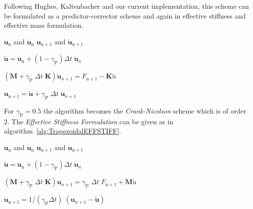 Following Hughes, Kaltenbacher and our current implementation, this scheme can be formulated as a predictor-corrector scheme 
and again in effective stiffness and
effective mass formulation.
\begin{algorithm}
\caption{General Trapezoidal Effective Mass Formulation} \label{alg:TrapezoidalEFFMASS}
\begin{algorithmic}
\REQUIRE $\mathbf{u}_{\mathrm{n}}$ and $\mathbf{\dot{u}}_{\mathrm{n}}$
\ENSURE $\mathbf{u}_{\mathrm{n}+1}$ and $\mathbf{\dot{u}}_{\mathrm{n}+1}$

\STATE {}
\STATE $\tilde{\mathbf{u}} = \mathbf{u}_{\mathrm{n}} + (1-\gamma_\mathrm{P}) \Delta t \; \mathbf{\dot{u}}_{n}$

\STATE {}
\STATE $\left( \mathbf{M} + \gamma_{\mathrm{P}}\; \Delta t\; \mathbf{K} \right) \mathbf{\dot{u}}_{n+1} =
F_{\mathrm{n}+1} - \mathbf{K} \tilde{\mathrm{u}}$ 

\STATE {}
\STATE $\mathbf{u}_{\mathrm{n}+1} = \tilde{\mathbf{u}} + \gamma_{\mathrm{P}}\; \Delta t \; \mathbf{\dot{u}}_{n+1}$
\end{algorithmic}
\end{algorithm}

For $\gamma_{\mathrm{P}} = 0.5$ the algorithm becomes the {\it Crank-Nicolson} scheme which is of order
2. The {\it Effective Stiffness Formulation} can be given as in
algorithm~\ref{alg:TrapezoidalEFFSTIFF}.

\begin{algorithm}
\caption{General Trapezoidal Effective Stiffness Formulation} \label{alg:TrapezoidalEFFSTIFF}
\begin{algorithmic}
\REQUIRE $\mathbf{u}_{\mathrm{n}}$ and $\mathbf{\dot{u}}_{\mathrm{n}}$
\ENSURE $\mathbf{u}_{\mathrm{n}+1}$ and $\mathbf{\dot{u}}_{\mathrm{n}+1}$

\STATE {}
\STATE $\tilde{\mathbf{u}} = \mathbf{u}_{\mathrm{n}} + (1-\gamma_\mathrm{P}) \Delta t \; \mathbf{\dot{u}}_{n}$

\STATE {}
\STATE $\left( \mathbf{M} + \gamma_{\mathrm{P}}\; \Delta t\; \mathbf{K} \right) \mathbf{u}_{n+1} = \gamma_{\mathrm{P}}\; \Delta t\;
F_{\mathrm{n}+1} + \mathbf{M} \tilde{\mathrm{u}}$ 

\STATE {}
\STATE $\mathbf{\dot{u}}_{\mathrm{n}+1} = 1/(\gamma_{\mathrm{P}}\Delta t) \; \left(\mathbf{u}_{n+1} - \tilde{\mathbf{u}}\right)$
\end{algorithmic}
\end{algorithm}
